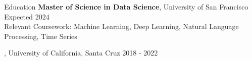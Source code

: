 \documentclass{resume} %
\begin{document}
\begin{rSection}{Education}
    {\bf Master of Science in Data Science}, University of San Francisco \hfill {Expected 2024}
    \\Relevant Coursework: Machine Learning, Deep Learning, Natural Language Processing, Time Series

    , University of California, Santa Cruz \hfill {2018 - 2022}
\end{rSection}

\end{document}
